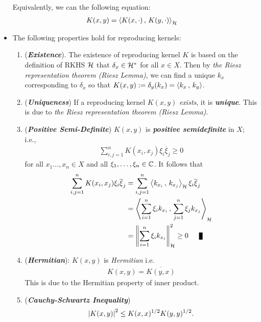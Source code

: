 \documentclass[11pt]{article}
\begin{document}
\begin{itemize}
\begin{remark}
Equivalently, we can the following equation:
\begin{align*}
K(x, y) &= \left\langle K(x, \cdot)\,,\, K(y, \cdot) \right\rangle_{{\mathcal H}}
\end{align*}
\end{remark}

\item \begin{remark}
The following properties hold for reproducing kernels:
\begin{enumerate}
\item (\emph{\textbf{Existence}}). The existence of reproducing kernel $K$ is based on the definition of RKHS ${\mathcal H}$ that $\delta_x \in {\mathcal H}^{*}$ for all $x \in X$. Then by \emph{the Riesz representation theorem (Riesz Lemma)}, we can find a unique $k_x$ corresponding to $\delta_x$ so that $K(x, y):= \delta_y(k_x) = \left\langle k_x\,,\, k_y \right\rangle$.

\item (\emph{\textbf{Uniqueness}}) If a reproducing kernel $K(x, y)$ \emph{exists}, it is \emph{\textbf{unique}}. This is due to \emph{the Riesz representation theorem (Riesz Lemma)}.

\item (\emph{\textbf{Positive Semi-Definite}}) $K(x, y)$ is \emph{\textbf{positive semidefinite}} in $X$; i.e., 
\begin{align*}
\sum_{i,j=1}^{n}K(x_{i}, x_{j})\xi_{i}\overline{\xi}_{j} \ge 0
\end{align*}
for all $x_{1}\ldots, x_{n}\in X$ and all $\xi_{1},\ldots, \xi_{n}\in {\mathbb C}$.  It follows that 
\begin{align*}
\sum_{i,j=1}^{n}K(x_{i}, x_{j})\xi_{i}\overline{\xi}_{j} &= \sum_{i,j=1}^{n}\inn{k_{x_i}}{k_{x_j}}_{\cH}\xi_{i}\overline{\xi}_{j}\\
&= \inn{ \sum_{i=1}^{n}\xi_{i}k_{x_i}}{\sum_{j=1}^{n}\xi_j k_{x_j}}_{\cH}\\
&= \norm{\sum_{i=1}^{n}\xi_{i}k_{x_i}}{\cH}^2 \ge 0 \qed
\end{align*}

\item (\emph{\textbf{Hermitian}}): $K(x, y)$ is \emph{Hermitian}  i.e.
\begin{align*}
K(x, y) = \overline{K(y, x)}
\end{align*}
This is due to the Hermitian property of inner product.

\item (\emph{\textbf{Cauchy-Schwartz Inequality}})
\begin{align*}
 \left\lvert K(x, y) \right\rvert^{2}\le K(x, x)^{1/2}K(y, y)^{1/2}.
\end{align*}
\end{enumerate}
\end{remark}
\end{itemize}
\end{document}
